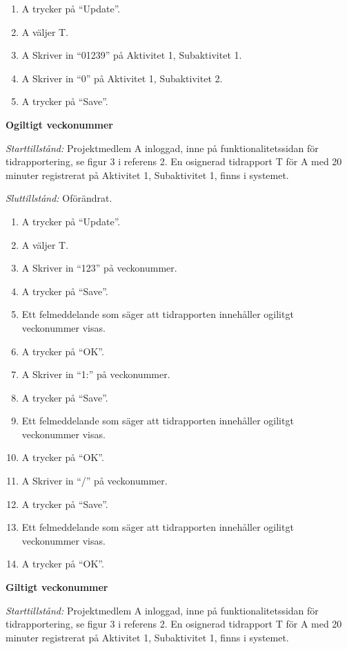 \documentclass[a4paper]{article}
\begin{document}
\begin{FT}
\begin{enumerate}
 \item A trycker på ``Update''.
 \item A väljer T.
 \item A Skriver in ``01239'' på Aktivitet 1, Subaktivitet 1.
 \item A Skriver in ``0'' på Aktivitet 1, Subaktivitet 2.
 \item A trycker på ``Save''.
\end{enumerate}

\item\textbf{Ogiltigt veckonummer}

\emph{Starttillstånd:} Projektmedlem A inloggad, inne på funktionalitetssidan för tidrapportering, se figur 3 i referens 2. En osignerad tidrapport T för A med 20 minuter registrerat på Aktivitet 1, Subaktivitet 1, finns i systemet.

\emph{Sluttillstånd:} Oförändrat.

\begin{enumerate}
\item A trycker på ``Update''.
\item A väljer T.
\item A Skriver in ``123'' på veckonummer.
\item A trycker på ``Save''.
\item Ett felmeddelande som säger att tidrapporten innehåller ogilitgt veckonummer visas.
\item A trycker på ``OK''.
\item A Skriver in ``1:'' på veckonummer.
\item A trycker på ``Save''.
\item Ett felmeddelande som säger att tidrapporten innehåller ogilitgt veckonummer visas.
\item A trycker på ``OK''.
\item A Skriver in ``/'' på veckonummer.
\item A trycker på ``Save''.
\item Ett felmeddelande som säger att tidrapporten innehåller ogilitgt veckonummer visas.
\item A trycker på ``OK''.
\end{enumerate}

\item\textbf{Giltigt veckonummer}

\emph{Starttillstånd:} Projektmedlem A inloggad, inne på funktionalitetssidan för tidrapportering, se figur 3 i referens 2. En osignerad tidrapport T för A med 20 minuter registrerat på Aktivitet 1, Subaktivitet 1, finns i systemet.


\end{FT}
\end{document}
